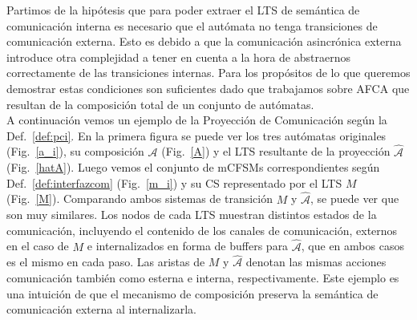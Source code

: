 Partimos de la hipótesis que para poder extraer el LTS de semántica de comunicación interna es necesario que el autómata no tenga transiciones de comunicación externa. Esto es debido a que la comunicación asincrónica externa introduce otra complejidad a tener en cuenta a la hora de abstraernos correctamente de las transiciones internas. Para los propósitos de lo que queremos demostrar estas condiciones son suficientes dado que trabajamos sobre AFCA que resultan de la composición total de un conjunto de autómatas.\\ 

A continuación vemos un ejemplo de la Proyección de Comunicación según la Def.~\ref{def:pci}. En la primera figura se puede ver los tres autómatas originales (Fig.~\ref{a_i}), su composición $\mathcal{A}$ (Fig.~\ref{A}) y el LTS resultante de la proyección $\hat{\mathcal{A}}$ (Fig.~\ref{hatA}). Luego vemos el conjunto de mCFSMs correspondientes según Def.~\ref{def:interfazcom} (Fig.~\ref{m_i}) y su CS representado por el LTS $M$ (Fig.~\ref{M}). Comparando ambos sistemas de transición $M$ y $\hat{\mathcal{A}}$, se puede ver que son muy similares. Los nodos de cada LTS muestran distintos estados de la comunicación, incluyendo el contenido de los canales de comunicación, externos en el caso de $M$ e internalizados en forma de buffers para $\hat{\mathcal{A}}$, que en ambos casos es el mismo en cada paso. Las aristas de $M$ y $\hat{\mathcal{A}}$ denotan las mismas acciones comunicación también como esterna e interna, respectivamente. Este ejemplo es una intuición de que el mecanismo de composición preserva la semántica de comunicación externa al internalizarla.

